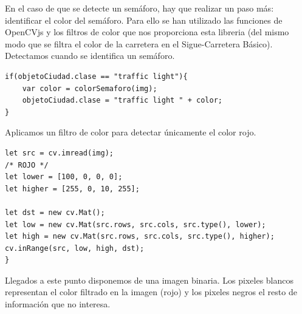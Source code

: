 \documentclass{report}
\begin{document}
\newpage
En el caso de que se detecte un semáforo, hay que realizar un paso más: identificar el color del semáforo. Para ello se han utilizado las funciones de OpenCVjs y los filtros de color que nos proporciona esta libreria (del mismo modo que se filtra el color de la carretera en el Sigue-Carretera Básico).
\\

Detectamos cuando se identifica un semáforo.

\begin{lstlisting}[backgroundcolor = \color{light-gray},
				   aboveskip = 2em,
				   belowskip = 2em,
                   xleftmargin = 2cm,
                   framexleftmargin = 1em,
                   basicstyle=\small]
if(objetoCiudad.clase == "traffic light"){
	var color = colorSemaforo(img);
	objetoCiudad.clase = "traffic light " + color;
}\end{lstlisting}

Aplicamos un filtro de color para detectar únicamente el color rojo.

\begin{lstlisting}[backgroundcolor = \color{light-gray},
				   aboveskip = 2em,
				   belowskip = 2em,
                   xleftmargin = 2cm,
                   framexleftmargin = 1em,
                   basicstyle=\small]
let src = cv.imread(img);
/* ROJO */
let lower = [100, 0, 0, 0];
let higher = [255, 0, 10, 255];

let dst = new cv.Mat();
let low = new cv.Mat(src.rows, src.cols, src.type(), lower);
let high = new cv.Mat(src.rows, src.cols, src.type(), higher);
cv.inRange(src, low, high, dst);
}\end{lstlisting}

Llegados a este punto disponemos de una imagen binaria. Los pixeles blancos representan el color filtrado en la imagen (rojo) y los pixeles negros el resto de información que no interesa.
\end{document}
